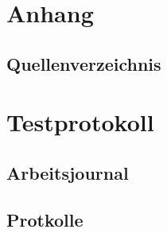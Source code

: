 \section{Anhang}


\clearpage
\renewcommand{\refname}{Literaturverzeichnis}
\subsection{Quellenverzeichnis}

\newpage


\section{Testprotokoll}


\subsection{Arbeitsjournal}
\label{app:Arbeitsjournal}


\subsection{Protkolle}
\label{app:Protokolle}




%
\clearpage


